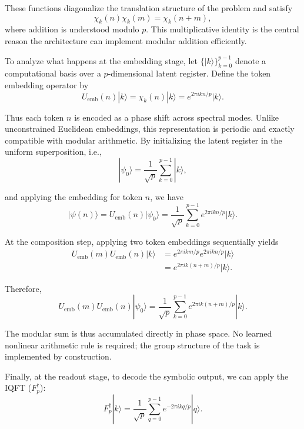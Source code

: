 \documentclass[11pt, a4paper]{article}
\begin{document}
\noindent These functions diagonalize the translation structure of the problem and satisfy
\begin{equation}
\chi_k(n)\chi_k(m)=\chi_k(n+m),
\end{equation}
where addition is understood modulo $p$. This multiplicative identity is the central reason the architecture can implement modular addition efficiently.

To analyze what happens at the embedding stage, let $\{|k\rangle\}_{k=0}^{p-1}$ denote a computational basis over a $p$-dimensional latent register. Define the token embedding operator by
\begin{equation}
U_{\mathrm{emb}}(n)|k\rangle=\chi_k(n)|k\rangle
=
e^{2\pi i kn/p}|k\rangle.
\end{equation}

\noindent Thus each token $n$ is encoded as a phase shift across spectral modes. Unlike unconstrained Euclidean embeddings, this representation is periodic and exactly compatible with modular arithmetic. By initializing the latent register in the uniform superposition, i.e.,
\begin{equation}
|\psi_0\rangle=\frac{1}{\sqrt p}\sum_{k=0}^{p-1}|k\rangle,
\end{equation}

\noindent and applying the embedding for token $n$, we have
\begin{equation}
|\psi(n)\rangle
=
U_{\mathrm{emb}}(n)|\psi_0\rangle
=
\frac{1}{\sqrt p}\sum_{k=0}^{p-1}e^{2\pi i kn/p}|k\rangle.
\end{equation}

At the composition step, applying two token embeddings sequentially yields
\begin{align}
U_{\mathrm{emb}}(m)U_{\mathrm{emb}}(n)|k\rangle
&=
e^{2\pi i km/p}e^{2\pi i kn/p}|k\rangle \\
&=
e^{2\pi i k(n+m)/p}|k\rangle.
\end{align}

\noindent Therefore,
\begin{equation}
U_{\mathrm{emb}}(m)U_{\mathrm{emb}}(n)|\psi_0\rangle
=
\frac{1}{\sqrt p}\sum_{k=0}^{p-1}e^{2\pi i k(n+m)/p}|k\rangle.
\end{equation}

\noindent The modular sum is thus accumulated directly in phase space. No learned nonlinear arithmetic rule is required; the group structure of the task is implemented by construction.

Finally, at the readout stage, to decode the symbolic output, we can apply the IQFT ($F_p^\dagger$):
\begin{equation}
F_p^\dagger |k\rangle
=
\frac{1}{\sqrt p}\sum_{q=0}^{p-1}e^{-2\pi i kq/p}|q\rangle.
\end{equation}
\end{document}
